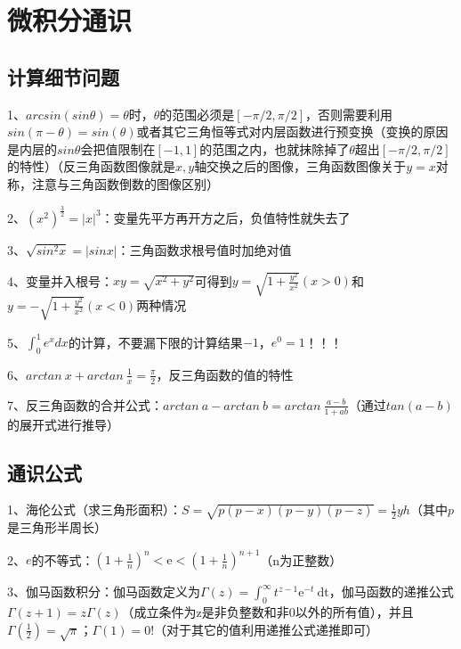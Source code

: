 \chapter{微积分通识}

\section{计算细节问题}

1、$arcsin(sin\theta)=\theta$时，$\theta$的范围必须是$[-\pi/2,\pi/2]$，否则需要利用$sin(\pi-\theta)=sin(\theta)$或者其它三角恒等式对内层函数进行预变换（变换的原因是内层的$sin\theta$会把值限制在$[-1,1]$的范围之内，也就抹除掉了$\theta$超出$[-\pi/2,\pi/2]$的特性）（反三角函数图像就是$x,y$轴交换之后的图像，三角函数图像关于$y=x$对称，注意与三角函数倒数的图像区别）

2、${(x^2)}^{\frac{3}{2}}=|x|^{3}$：变量先平方再开方之后，负值特性就失去了

3、$\sqrt{sin^2x}=|sinx|$：三角函数求根号值时加绝对值

4、变量并入根号：$xy=\sqrt{x^2+y^2}$可得到$y=\sqrt{1+\frac{y^2}{x^2}}(x > 0)$和$y=-\sqrt{1+\frac{y^2}{x^2}}(x < 0)$两种情况

5、$\int_{0}^{1} e^x dx$的计算，不要漏下限的计算结果$-1$，$e^0=1$！！！

6、$arctan\ x + arctan\ \frac{1}{x}=\frac{\pi}{2}$，反三角函数的值的特性

7、反三角函数的合并公式：$arctan\ a - arctan\ b=arctan\ \frac{a-b}{1+ab}$（通过$tan(a-b)$的展开式进行推导）



\section{通识公式}

1、海伦公式（求三角形面积）：$S=\sqrt{p(p-x)(p-y)(p-z)}=\frac{1}{2} y h$（其中$p$是三角形半周长）

2、$e$的不等式：$\left(1+\frac{1}{n}\right)^{n}<\mathrm{e}<\left(1+\frac{1}{n}\right)^{n+1}$（n为正整数）

3、伽马函数积分：伽马函数定义为$\Gamma(z)=\int_{0}^{\infty} t^{z-1} \mathrm{e}^{-t} \mathrm{~d} \mathrm{t}$，伽马函数的递推公式$\Gamma(z+1)=z \Gamma(z)$（成立条件为z是非负整数和非0以外的所有值），并且$\Gamma\left(\frac{1}{2}\right) =\sqrt{\pi}$；$\Gamma(1) =0 !$（对于其它的值利用递推公式递推即可）




